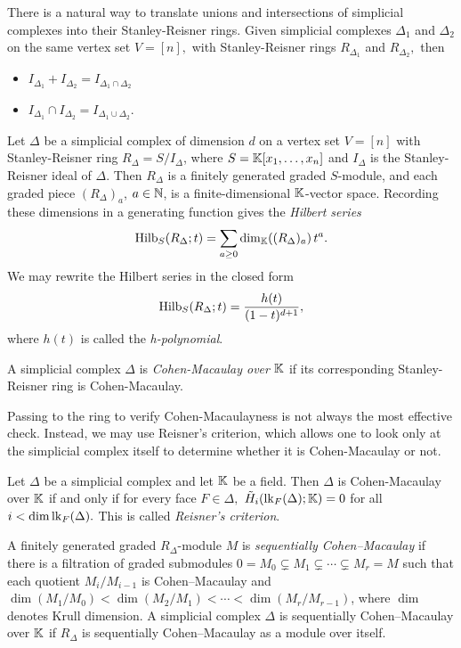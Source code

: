 There is a natural way to translate unions and intersections of simplicial complexes into their Stanley-Reisner rings. Given simplicial complexes $\Delta_1$ and $\Delta_2$ on the same vertex set $V = [n],$ with Stanley-Reisner rings $R_{\Delta_1}$ and $R_{\Delta_2},$ then 
\begin{itemize}
    \item $I_{\Delta_1} + I_{\Delta_2} = I_{\Delta_1\cap\Delta_2}$
    \item $I_{\Delta_1}\cap I_{\Delta_2} = I_{\Delta_1\cup\Delta_2}.$
\end{itemize}
Let $\Delta$ be a simplicial complex of dimension $d$ on a vertex set $V = [n]$
with Stanley-Reisner ring $R_\Delta = S/I_\Delta$, where $S = \mathbb{K}[x_1,\ldots,x_n]$ and $I_\Delta$ is the Stanley-Reisner ideal of $\Delta$. Then $R_\Delta$ is a finitely generated graded $S$-module, and each graded piece $(R_\Delta)_a$, $a\in\mathbb{N}$, is a finite-dimensional $\mathbb{K}$-vector space. Recording these dimensions in a generating function gives the \emph{Hilbert series}
\[
\mathrm{Hilb}_S(R_\Delta;t) = \sum_{a\geq 0}\dim_{\mathbb{K}}\!\left((R_\Delta)_a\right)t^a.
\]
We may rewrite the Hilbert series in the closed form
\[
\mathrm{Hilb}_S(R_\Delta;t) = \frac{h(t)}{(1-t)^{d+1}},
\]
where $h(t)$ is called the \emph{h-polynomial}.
\begin{definition}   
     A simplicial complex $\Delta$ is \emph{Cohen-Macaulay over $\mathbb{K}$} if its corresponding Stanley-Reisner ring is Cohen-Macaulay.
\end{definition}
Passing to the ring to verify Cohen-Macaulayness is not always the most effective check. Instead, we may use Reisner's criterion, which allows one to look only at the simplicial complex itself to determine whether it is Cohen-Macaulay or not.
\begin{theorem}
    Let $\Delta$ be a simplicial complex and let $\mathbb{K}$ be a field. Then $\Delta$ is Cohen-Macaulay over $\mathbb{K}$ if and only if for every face $F\in\Delta,$ $\Tilde{H}_i(\mathrm{lk}_F(\Delta);\mathbb{K}) = 0$ for all $i<\dim\mathrm{lk}_F(\Delta).$ This is called \emph{Reisner's criterion}.
\end{theorem}
\begin{definition}
\label{def: sequentially CM}
    A finitely generated graded $R_\Delta$-module $M$ is \emph{sequentially Cohen--Macaulay}
    if there is a filtration of graded submodules
    $0 = M_0 \subsetneq M_1 \subsetneq \cdots \subsetneq M_r = M$
    such that each quotient $M_i/M_{i-1}$ is Cohen--Macaulay and
    $\dim(M_1/M_0) < \dim(M_2/M_1) < \cdots < \dim(M_r/M_{r-1})$,
    where $\dim$ denotes Krull dimension.
    A simplicial complex $\Delta$ is sequentially Cohen--Macaulay over $\mathbb{K}$ if $R_\Delta$ is sequentially Cohen--Macaulay as a module over itself.
\end{definition}
